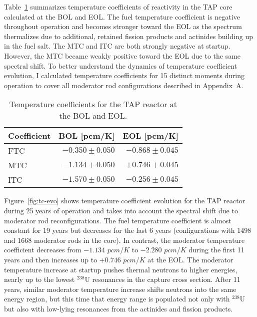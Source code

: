 Table~\ref{tab:tcoef_tap} summarizes temperature coefficients of reactivity in 
the 
\gls{TAP} core calculated at the \gls{BOL} and \gls{EOL}. The fuel 
temperature coefficient is negative throughout operation and becomes stronger 
toward the \gls{EOL} as the spectrum thermalizes due to additional, retained 
fission products and actinides building up in the fuel salt. 
The MTC and ITC are both strongly negative at startup. However, the MTC became 
weakly positive toward the \gls{EOL} due to the same spectral shift. To better 
understand the dynamics of temperature coefficient evolution, I calculated 
temperature coefficients for 15 distinct moments during operation to cover all 
moderator rod configurations described in Appendix~A.
\begin{table}[ht!]
	\caption{Temperature coefficients for the \gls{TAP} reactor at the 
	\gls{BOL} and \gls{EOL}.}
		\centering
	\begin{tabularx}{0.6\textwidth}{ X  r r } \hline
		\textbf{Coefficient} & \textbf{\gls{BOL} [pcm/K]} & \textbf{\gls{EOL} 
		[pcm/K]}                  \tabularnewline 
		[5pt] \hline
		FTC & $-0.350\pm0.050$ & $-0.868\pm0.045$ 
		\tabularnewline [3pt] \hline
		MTC & $-1.134\pm0.050$ & $+0.746\pm0.045$  
		\tabularnewline [3pt] \hline
		ITC & $-1.570\pm0.050$ & $-0.256\pm0.045$  
		\tabularnewline [3pt] \hline
	\end{tabularx}
	\label{tab:tcoef_tap}
\end{table}

Figure~\ref{fig:tc-evo} shows temperature coefficient evolution for the 
\gls{TAP} reactor during 25 years of operation and takes into account the
spectral shift due to moderator rod reconfigurations. The fuel temperature 
coefficient is almost 
constant for 19 years but decreases for the last 6 years (configurations with 
1498 and 1668 moderator rods in the core). In contrast, the moderator 
temperature coefficient decreases from $-1.134$ $pcm$/$K$ to $-2.280$ 
$pcm$/$K$ during the first 11 years and then increases up to $+0.746$ 
$pcm$/$K$ at the \gls{EOL}. 
The moderator temperature increase at startup pushes thermal neutrons to 
higher energies, nearly up to the lowest 
$^{238}$U resonances in the capture cross section. After 11 years, similar 
moderator temperature increase shifts neutrons into the same 
energy region, but this time that energy range is populated not only with 
$^{238}$U but also with low-lying resonances from the actinides and fission 
products.


